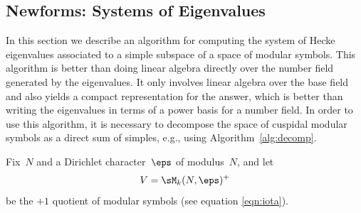 \subsection{Newforms: Systems of Eigenvalues}\label{sec:syseigen}
In this section we describe an algorithm for computing
the system of Hecke eigenvalues associated to a simple
subspace of a space of modular symbols.   This algorithm
is better than  doing linear algebra directly
over the number field generated by the eigenvalues.  It
only involves linear algebra over the base field and also
yields a compact representation for the answer, which
is better than writing the eigenvalues in terms of
a power basis for a number field.
In order to use this algorithm, it is necessary to
decompose the space of cuspidal modular symbols as a
direct sum of simples, e.g., using Algorithm~\ref{alg:decomp}.



Fix~$N$ and a Dirichlet character~$\eps$ of modulus~$N$,
and let 
$$
  V=\sM_k(N,\eps)^+
$$
be the $+1$ quotient of
modular symbols (see equation \eqref{eqn:iota}).

